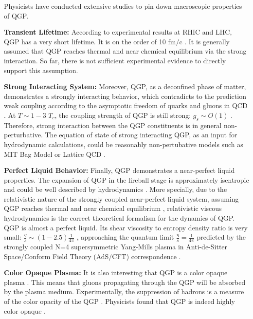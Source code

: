 Physicists have conducted extensive studies to pin down macroscopic properties of QGP. 

\textbf{Transient Lifetime:} According to experimental results at RHIC and LHC, QGP has a very short lifetime. It is on the order of 10 fm/c \cite{QGPLifeTime}. It is generally assumed that QGP reaches thermal \cite{QGPThermal} and near chemical equilibrium \cite{QGPChemical} via the strong interaction. So far, there is not sufficient experimental evidence to directly support this assumption.

\textbf{Strong Interacting System:} Moreover, QGP, as a deconfined phase of matter, demonstrates a strongly interacting behavior, which contradicts to the prediction weak coupling according to the asymptotic freedom of quarks and gluons in QCD \cite{QCDAsym}. At $T \sim 1 - 3$ $T_c$, the coupling strength of QGP is still strong: $g_s \sim O(1)$ \cite{sQGP}. Therefore, strong interaction between the QGP constituents is in general non-perturbative. The equation of state of strong interacting QGP, as an input for hydrodynamic calculations, could be reasonably non-pertubative models such as MIT Bag Model or Lattice QCD \cite{LatticeEOS}. 

\textbf{Perfect Liquid Behavior:} Finally, QGP demonstrates a near-perfect liquid properties. The expansion of QGP in the fireball stage is approximately isentropic and could be well described by hydrodynamics \cite{Bjorken}. More specially, due to the relativistic nature of the strongly coupled near-perfect liquid system, assuming QGP reaches thermal \cite{QGPThermal} and near chemical equilibrium \cite{QGPChemical}, relativistic viscous hydrodynamics \cite{4DHydro} is the correct theoretical formalism for the dynamics of QGP. QGP is almost a perfect liquid. Its shear viscosity to entropy density ratio is very small: $\frac{\eta}{s}\sim (1 - 2.5) \frac{1}{4\pi}$ \cite{QGPEtaOverS}, approaching the quantum limit $\frac{\eta}{s} = \frac{1}{4\pi}$ predicted by the strongly coupled N=4 supersymmetric Yang-Mills plasma in Anti-de-Sitter Space/Conform Field Theory (AdS/CFT) correspondence \cite{ADSCFT}.

\textbf{Color Opaque Plasma:} It is also interesting that QGP is a color opaque plasma \cite{QGPGen}. This means that gluons propagating through the QGP will be absorbed by the plasma medium. Experimentally, the suppression of hadrons is a measure of the color opacity of the QGP \cite{QGPGen}. Physicists found that QGP is indeed highly color opaque \cite{QGPOpaque}.


